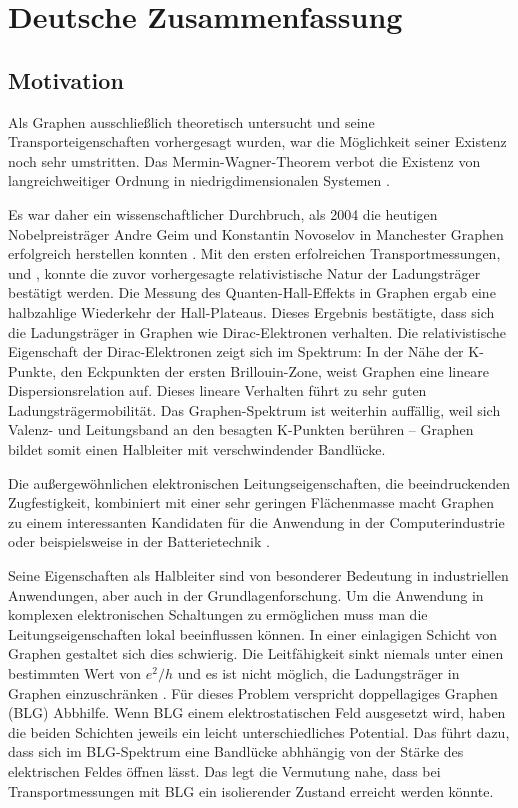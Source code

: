 \section*{Deutsche Zusammenfassung}
\subsection*{Motivation}

Als Graphen ausschlie{\ss}lich theoretisch untersucht und seine Transporteigenschaften vorhergesagt wurden, war die M\"oglichkeit seiner Existenz noch sehr umstritten. Das Mermin-Wagner-Theorem verbot die Existenz von langreichweitiger Ordnung in niedrigdimensionalen Systemen \cite{Mermin1966}.

Es war daher ein wissenschaftlicher Durchbruch, als 2004 die heutigen Nobelpreistr\"ager Andre Geim und Konstantin Novoselov in Manchester Graphen erfolgreich herstellen konnten \cite{Novoselov2004}. Mit den ersten erfolreichen Transportmessungen, \cite{Zhang2005} und \cite{Novoselov2005}, konnte die zuvor vorhergesagte relativistische Natur der Ladungstr\"ager \cite{Semenoff1984} best\"atigt werden. Die Messung des Quanten-Hall-Effekts in Graphen ergab eine halbzahlige Wiederkehr der Hall-Plateaus. Dieses Ergebnis best\"atigte, dass sich die Ladungstr\"ager in Graphen wie Dirac-Elektronen verhalten.
Die relativistische Eigenschaft der Dirac-Elektronen zeigt sich im Spektrum: In der N\"ahe der K-Punkte, den Eckpunkten der ersten Brillouin-Zone, weist Graphen eine lineare Dispersionsrelation auf. Dieses lineare Verhalten f\"uhrt zu sehr guten Ladungstr\"agermobilit\"at. Das Graphen-Spektrum ist weiterhin auff\"allig, weil sich Valenz- und Leitungsband an den besagten K-Punkten ber\"uhren -- Graphen bildet somit einen Halbleiter mit verschwindender Bandl\"ucke. 

Die au{\ss}ergew\"ohnlichen elektronischen Leitungseigenschaften, die beeindruckenden Zugfestigkeit, kombiniert mit einer sehr geringen Fl\"achenmasse macht Graphen zu einem interessanten Kandidaten f\"ur die Anwendung in der Computerindustrie \cite{Jurewicz2014} oder beispielsweise in der Batterietechnik \cite{Son2017}.

Seine Eigenschaften als Halbleiter sind von besonderer Bedeutung in industriellen Anwendungen, aber auch in der Grundlagenforschung. Um die Anwendung in komplexen elektronischen Schaltungen zu erm\"oglichen muss man die Leitungseigenschaften lokal beeinflussen k\"onnen. In einer einlagigen Schicht von Graphen gestaltet sich dies schwierig. Die Leitf\"ahigkeit sinkt niemals unter einen bestimmten Wert von $e^2/h$ und es ist nicht m\"oglich, die Ladungstr\"ager in Graphen einzuschr\"anken \cite{Katsnelson2006}. F\"ur dieses Problem verspricht doppellagiges Graphen (BLG) Abbhilfe. Wenn BLG einem elektrostatischen Feld ausgesetzt wird, haben die beiden Schichten jeweils ein leicht unterschiedliches Potential. Das f\"uhrt dazu, dass sich im BLG-Spektrum eine Bandl\"ucke abhh\"angig von der St\"arke des elektrischen Feldes \"offnen l\"asst. Das legt die Vermutung nahe, dass bei Transportmessungen mit BLG ein isolierender Zustand erreicht werden k\"onnte.


